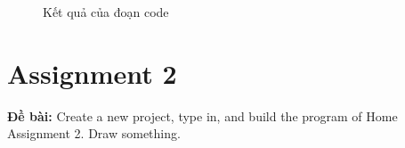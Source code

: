 \documentclass[a4paper,12pt]{article}
\begin{document}
\begin{figure}[ht!]
	\centerline{}
	\caption{Kết quả của đoạn code}
	\label{fig:ass1}
\end{figure}
\clearpage
\section{Assignment 2}
\textbf{Đề bài: }Create a new project, type in, and build the program of Home Assignment 2. Draw something.
\end{document}
